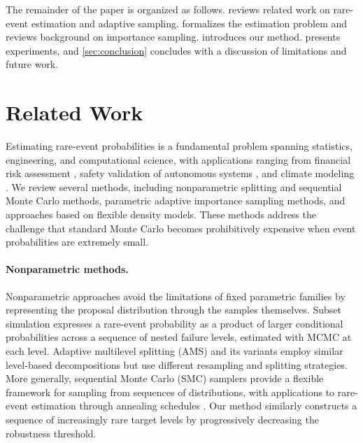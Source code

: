 \documentclass[twoside,11pt]{article}
\begin{document}
The remainder of the paper is organized as follows.  reviews related work on rare-event estimation and adaptive sampling.  formalizes the estimation problem and reviews background on importance sampling.  introduces our method.  presents experiments, and \cref{sec:conclusion} concludes with a discussion of limitations and future work.

\section{Related Work}
\label{sec:related}

Estimating rare-event probabilities is a fundamental problem spanning statistics, engineering, and computational science, with applications ranging from financial risk assessment \citep{komljenovic2016assetrisk}, safety validation of autonomous systems \citep{corso2020survey}, and climate modeling \citep{dessai2004doesclimate}. We review several methods, including nonparametric splitting and sequential Monte Carlo methods, parametric adaptive importance sampling methods, and approaches based on flexible density models. These methods address the challenge that standard Monte Carlo becomes prohibitively expensive when event probabilities are extremely small.

\paragraph{Nonparametric methods.}
Nonparametric approaches avoid the limitations of fixed parametric families by representing the proposal distribution through the samples themselves. Subset simulation \citep{au2001estimation} expresses a rare-event probability as a product of larger conditional probabilities across a sequence of nested failure levels, estimated with MCMC at each level. Adaptive multilevel splitting (AMS) \citep{cerou2007adaptive} and its variants employ similar level-based decompositions but use different resampling and splitting strategies. More generally, sequential Monte Carlo (SMC) samplers \citep{del2006sequential,cerou2012sequential} provide a flexible framework for sampling from sequences of distributions, with applications to rare-event estimation through annealing schedules \citep{neal2001annealed}. Our method similarly constructs a sequence of increasingly rare target levels by progressively decreasing the robustness threshold.
\end{document}
